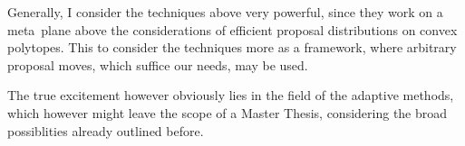 \documentclass[10pt]{article}
\begin{document}
Generally, I consider the techniques above very powerful, since they work on a meta~plane above the considerations of efficient proposal distributions on convex polytopes. 
This  to consider the techniques more as a framework, where arbitrary proposal moves, which suffice our needs, may be used.

The true excitement however obviously lies in the field of the adaptive methods, which however might leave the scope of 
a Master Thesis, considering the broad possiblities already outlined before.


%
%


\end{document}
